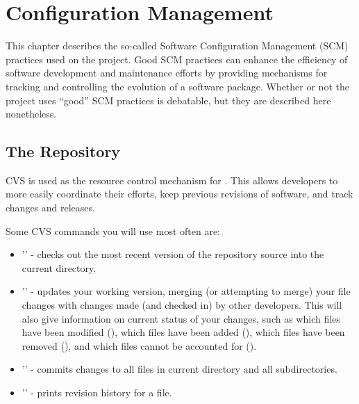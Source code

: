 \chapter{Configuration Management}
\label{Configuration Management}

This chapter describes the so-called Software Configuration Management
(SCM) practices used on the \hypre{} project.  Good SCM practices can
enhance the efficiency of software development and maintenance efforts
by providing mechanisms for tracking and controlling the evolution of
a software package.  Whether or not the \hypre{} project uses ``good''
SCM practices is debatable, but they are described here nonetheless.

\section{The Repository}
\label{The Repository}

CVS is used as the resource control mechanism for \hypre{}.  This
allows developers to more easily coordinate their efforts, keep
previous revisions of software, and track changes and releases.

Some CVS commands you will use most often are:
\begin{itemize}
\item '' - checks out the most
recent version of the repository source into the current directory.
\item '' - updates your working version, merging
(or attempting to merge) your file changes with changes made (and
checked in) by other developers.  This will also give information on
current status of your changes, such as which files have been modified
(), which files have been added (), which files have
been removed (), and which files cannot be accounted for
().
\item '' - commits changes to all files in current
directory and all subdirectories.
\item '' - prints revision history for a file.
\end{itemize}

